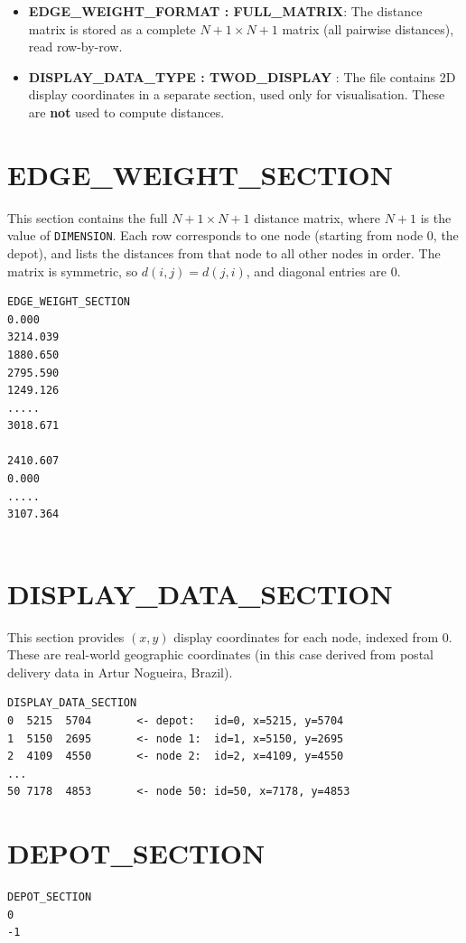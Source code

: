 \documentclass[a4paper]{report}
\begin{document}
{\begin{itemize}
\begin{itemize}
\begin{appendices}
\begin{itemize}
    \item \textbf{EDGE\_WEIGHT\_FORMAT : FULL\_MATRIX}: The distance matrix is
    stored as a complete $N+1 \times N+1$ matrix (all pairwise distances), read
    row-by-row.

    \item \textbf{DISPLAY\_DATA\_TYPE : TWOD\_DISPLAY} : The file contains 2D
    display coordinates in a separate section, used only for visualisation. These
    are \textbf{not} used to compute distances.
\end{itemize}
\section*{EDGE\_WEIGHT\_SECTION}
This section contains the full $N+1 \times N+1$ distance matrix, where $N+1$ is the value of \texttt{DIMENSION}. Each row corresponds to one node (starting from node 0, the depot), and lists the distances from that node to all other nodes in order. The matrix is symmetric, so $d(i,j) = d(j,i)$, and diagonal entries are 0.
\begin{verbatim}
EDGE_WEIGHT_SECTION
0.000
3214.039
1880.650
2795.590
1249.126
.....
3018.671

2410.607
0.000    
.....
3107.364


\end{verbatim}
\section*{DISPLAY\_DATA\_SECTION}

This section provides $(x, y)$ display coordinates for each node, indexed from 0.
These are real-world geographic coordinates (in this case derived from postal
delivery data in Artur Nogueira, Brazil).

\begin{verbatim}
DISPLAY_DATA_SECTION
0  5215  5704       <- depot:   id=0, x=5215, y=5704
1  5150  2695       <- node 1:  id=1, x=5150, y=2695
2  4109  4550       <- node 2:  id=2, x=4109, y=4550
...
50 7178  4853       <- node 50: id=50, x=7178, y=4853
\end{verbatim}

\section*{DEPOT\_SECTION}

\begin{verbatim}
DEPOT_SECTION
0
-1
\end{verbatim}


\end{appendices}
\end{itemize}
\end{itemize}}
\end{document}
